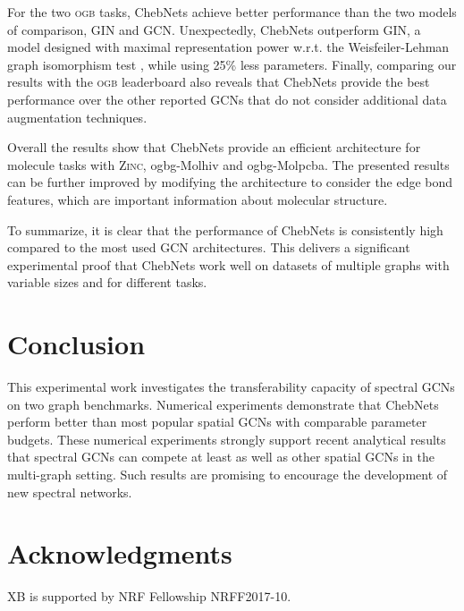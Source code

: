 \documentclass[letterpaper]{article} \usepackage{aaai21}  \usepackage{times}  \usepackage{helvet} \usepackage{courier}  \usepackage[hyphens]{url}  \usepackage{graphicx} \usepackage{natbib}  \usepackage{caption} \frenchspacing  \setlength{\pdfpagewidth}{8.5in}  \setlength{\pdfpageheight}{11in}
\begin{document}
For the two \textsc{ogb} tasks, ChebNets achieve better performance than the two models of comparison, GIN and GCN.
Unexpectedly, ChebNets outperform GIN, a model designed with maximal representation power w.r.t. the Weisfeiler-Lehman graph isomorphism test \cite{weisfeiler1968reduction}, while using 25\% less parameters.
Finally, comparing our results with the \textsc{ogb} leaderboard also reveals that ChebNets provide the best performance over the other reported GCNs that do not consider additional data augmentation techniques.



Overall the results show that ChebNets provide an efficient architecture for molecule tasks with \textsc{Zinc}, ogbg-Molhiv and ogbg-Molpcba. The presented results can be further improved by modifying the architecture to consider the edge bond features, which are important information about molecular structure.



To summarize, it is clear that the performance of ChebNets  is consistently high compared to the most used GCN architectures. This delivers a significant experimental proof that ChebNets work well on datasets of multiple graphs with variable sizes and for different tasks.




\section{Conclusion}
This experimental work investigates the transferability capacity of spectral GCNs on two graph benchmarks.
Numerical experiments demonstrate that ChebNets perform better than most popular spatial GCNs with comparable parameter budgets. These numerical experiments strongly support recent analytical results \cite{levie_transferability_2019,levie_transferability_2019-1} that spectral GCNs can compete at least as well as other spatial GCNs in the multi-graph setting. Such results are promising to encourage the development of new spectral networks.


\section{Acknowledgments}
XB is supported by NRF Fellowship NRFF2017-10.


\end{document}
